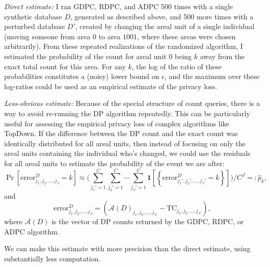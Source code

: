 \documentclass{article}
\begin{document}
\emph{Direct estimate:} I ran GDPC, RDPC, and ADPC 500 times with a single synthetic database $D$, generated as described above, and 500 more times with a perturbed database $D'$, created by changing the areal unit of a single individual (moving someone from area $0$ to area $1001$, where these areas were chosen arbitrarily). From these repeated realizations of the randomized algorithm, I estimated the probability of the count for areal unit $0$ being $k$ away from the exact total count for this area.  For any $k$, the log of the ratio of these probabilities constitutes a (noisy) lower bound on $\epsilon$, and the maximum over these log-ratios could be used as an empirical estimate of the privacy loss.


\emph{Less-obvious estimate:} Because of the special structure of count queries, there is a way to avoid re-running the DP algorithm repeatedly.  This can be particularly useful for assessing the empirical privacy loss of complex algorithms like TopDown. If the difference between the DP count and the exact count was identically distributed for all areal units, then instead of focusing on only the areal units containing the individual who's changed, we could use the residuals for all areal units to estimate the probability of the event we are after:
$$\Pr\left[\mathrm{error}_{j_1, j_2, \ldots, j_{J}}^D
= k\right]
\approx
\bigg(\sum_{j_1'=1}^C\sum_{j_2'=1}^C\cdots\sum_{j_J' = 1}^C \mathbf{1}\left[\left\{\mathrm{error}_{j_1', j_2', \ldots, j_{J}'}^D
= k\right\}\right]\bigg)\bigg/C^J =: \hat{p}_k,
$$
and $$\mathrm{error}_{j_1, j_2, \ldots, j_{J}}^D = \left(\mathcal{A}(D)_{j_1, j_2, \ldots, j_{J'}}
- \mathrm{TC}_{j_1, j_2, \ldots, j_{J'}}\right),$$
where $\mathcal{A}(D)$ is the vector of DP counts returned by the GDPC, RDPC, or ADPC algorithm.

We can make this estimate with more precision than the direct estimate, using substantially less computation.
\end{document}
